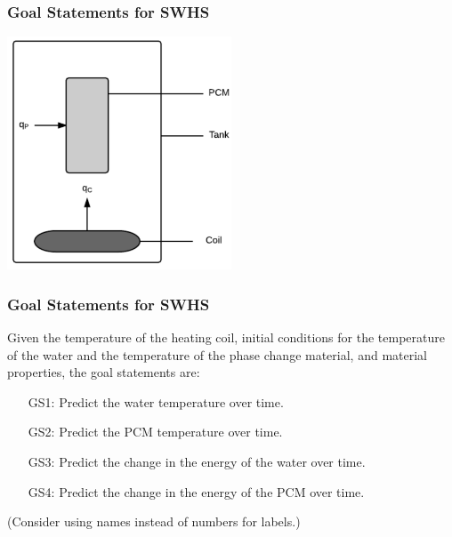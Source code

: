 \documentclass[t,12pt,numbers,fleqn]{beamer}
\begin{document}
\begin{frame}
\frametitle{Goal Statements for SWHS}

\begin{center}
 \includegraphics[width=0.5\textwidth]{../Figures/Tank.pdf}
\end{center}

\end{frame}


\begin{frame}
\frametitle{Goal Statements for SWHS}

\noindent Given the temperature of the heating coil, initial conditions for the
temperature of the water and the temperature of the phase change material, and
material properties, the goal statements are:

\begin{itemize}

\item[GS1:] Predict the water 
temperature over time.

\item[GS2:] Predict the PCM 
temperature over time.
	
\item[GS3:] Predict the 
change in the energy of the water over time.

\item[GS4:] Predict the 
change in the energy of the PCM over time.

\end{itemize}

(Consider using names instead of numbers for labels.)

\end{frame}
\end{document}
